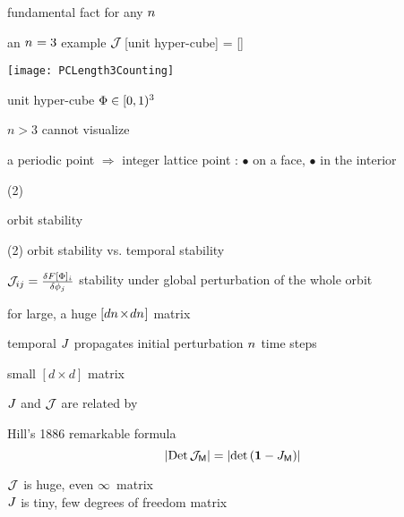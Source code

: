 \begin{frame}{fundamental fact for any ${n_{}}$}

    \begin{block}{an ${n_{}}=3$ example} %
${\cal J}\,$[unit hyper-cube] = [{\fundPip}]
\begin{center}
            \begin{minipage}[c]{0.32\textwidth}\begin{center}
\texttt{[image: PCLength3Counting]}
            \end{center}\end{minipage}
            \hspace{2ex}
            \begin{minipage}[c]{0.46\textwidth}
unit hyper-cube $\Phi\in[0,1)^3$
\bigskip\bigskip

{\footnotesize $n>3$ cannot visualize}
            \end{minipage}
\end{center}
    \end{block}
    {\footnotesize
a periodic point $\Rightarrow$ integer lattice point :
{\color{red}$\bullet$} on a face,
{\color{blue}$\bullet$} in the interior
    }
\end{frame} %

\begin{frame}{(2)}
\vfill
\begin{center}
{\huge orbit stability}
\end{center}
\vfill
\end{frame} %

\begin{frame}{(2) orbit stability vs. temporal stability}
\begin{block}{\jacobianOrb}
\(
{\cal J}_{ij} =\frac{\delta F[\Phi]_i}{\delta \phi_j}
\)
stability under {\color{blue}global} perturbation of the whole orbit

\hfill for \cl{} large, a huge $[d{n_{}}\!\times\!d{n_{}}]$ matrix
\end{block}
\begin{block}{temporal {\jacobianM}}
\(
\jMps%
\)
propagates {\color{blue}initial} perturbation ${n_{}}$ time steps

\hfill small $[d\!\times\!d]$ matrix
\end{block}
\vfill

$J$ and ${\cal J}$ are related by
\begin{block}{Hill's 1886 remarkable formula}
\[
|\mbox{\rm Det}\,{\cal J}_{\mathsf{M}}| = |\mbox{\rm det}\,({\bf 1} - J_{\mathsf{M}})|
\]
\end{block}
${\cal J}$ is {\color{red}huge}, even $\infty$\dmn\ matrix\\
$J$ is {\color{red}tiny}, few degrees of freedom matrix
\end{frame} %

